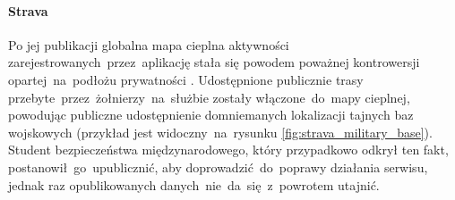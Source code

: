 \paragraph{Strava}
Po jej publikacji globalna mapa cieplna aktywności zarejestrowanych~przez~aplikację  stała się powodem poważnej kontrowersji opartej~na~podłożu prywatności \cite{Strava_Military_Bases}. Udostępnione publicznie trasy przebyte~przez~żołnierzy~na~służbie zostały włączone~do~mapy cieplnej, powodując publiczne udostępnienie domniemanych lokalizacji tajnych baz wojskowych (przykład jest widoczny~na~rysunku \ref{fig:strava_military_base}). Student bezpieczeństwa międzynarodowego, który przypadkowo odkrył ten fakt, postanowił~go~upublicznić, aby doprowadzić~do~poprawy działania serwisu, jednak raz opublikowanych danych~nie~da~się~z~powrotem utajnić.

\bigskip
{}

